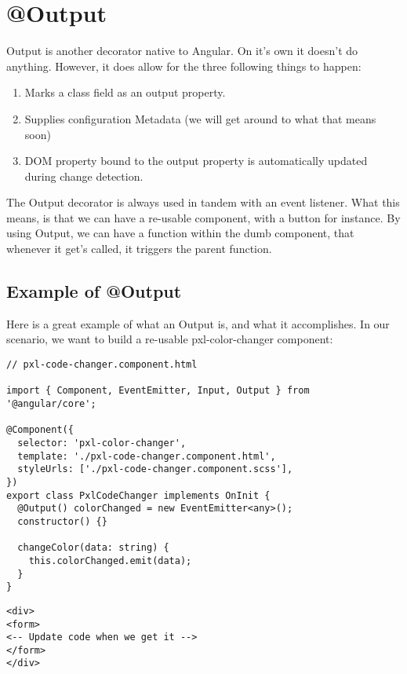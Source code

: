 \maketitle{}
\section{ @Output }

Output is another decorator native to Angular. On it's own it doesn't do
anything. However, it does allow for the three following things to happen:
\begin{enumerate}
  \item Marks a class field as an output property.
  \item Supplies configuration Metadata (we will get around to what that means
  soon)
  \item DOM property bound to the output property is automatically updated
  during change detection.
\end{enumerate}

The Output decorator is always used in tandem with an event listener. What this
means, is that we can have a re-usable component, with a button for instance.
By using Output, we can have a function within the dumb component, that whenever
it get's called, it triggers the parent function.

\subsection{ Example of @Output }

Here is a great example of what an Output is, and what it accomplishes. In
our scenario, we want to build a re-usable pxl-color-changer component:
\begin{lstlisting}
// pxl-code-changer.component.html

import { Component, EventEmitter, Input, Output } from '@angular/core';

@Component({
  selector: 'pxl-color-changer',
  template: './pxl-code-changer.component.html',
  styleUrls: ['./pxl-code-changer.component.scss'],
})
export class PxlCodeChanger implements OnInit {
  @Output() colorChanged = new EventEmitter<any>();
  constructor() {}

  changeColor(data: string) {
    this.colorChanged.emit(data);
  }
}
\end{lstlisting}

\begin{lstlisting}
<div>
<form>
<-- Update code when we get it -->
</form>
</div>
\end{lstlisting}

